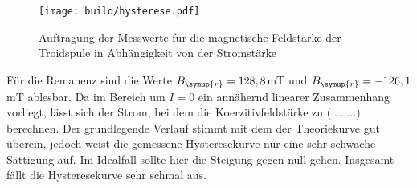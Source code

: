 \begin{figure}
  \centering
  \texttt{[image: build/hysterese.pdf]}
  \caption{Auftragung der Messwerte für die magnetische Feldstärke der Troidspule
  in Abhängigkeit von der Stromstärke}
  \label{fig:hysterese}
\end{figure}



Für die Remanenz sind die Werte $B_{\symup{r}}=128,8$mT und $B_{\symup{r}}=-126,1$mT
ablesbar. Da im Bereich um $I=0$ ein annähernd linearer Zusammenhang vorliegt, lässt
sich der Strom, bei dem die Koerzitivfeldstärke zu (........) berechnen.
Der grundlegende Verlauf stimmt mit dem der Theoriekurve gut überein, jedoch weist
die gemessene Hysteresekurve nur eine sehr schwache Sättigung auf. Im Idealfall sollte
hier die Steigung gegen null gehen. Insgesamt fällt die Hysteresekurve sehr schmal aus.

